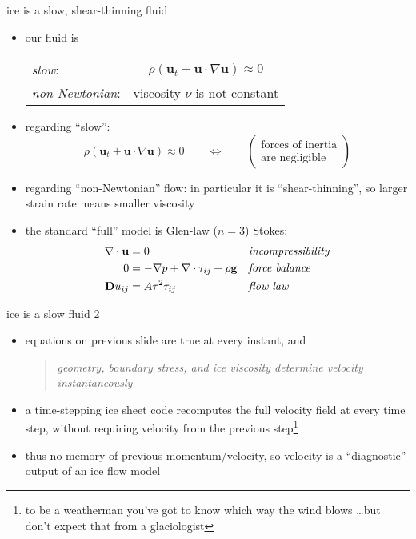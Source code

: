 \begin{frame}{ice is a slow, shear-thinning fluid}

\begin{itemize}
\item our fluid is

  \begin{tabular}{lc}
  \emph{slow}: & $\rho \left(\mathbf{u}_t + \mathbf{u}\cdot\nabla \mathbf{u}\right) \approx 0$ \\
  \emph{non-Newtonian}: & viscosity $\nu$ is not constant
  \end{tabular}
\item regarding ``slow'':
  $$\rho \left(\mathbf{u}_t + \mathbf{u}\cdot\nabla \mathbf{u}\right) \approx 0 \qquad \iff \qquad \begin{pmatrix} \text{forces of inertia} \\ \text{are negligible} \end{pmatrix}$$
\item regarding ``non-Newtonian'' flow:  in particular it is ``shear-thinning'', so larger strain rate means smaller viscosity
\item the standard ``full'' model is Glen-law ($n=3$) Stokes:
\begin{align*}
\nabla \cdot \mathbf{u} &= 0 &&\text{\emph{incompressibility}} \\
0 &= - \nabla p + \nabla \cdot \tau_{ij} + \rho \mathbf{g} &&\text{\emph{force balance}} \\
\mathbf{D}u_{ij} &= A \tau^2 \tau_{ij} &&\text{\emph{flow law}}
\end{align*}
\end{itemize}
\end{frame}


\begin{frame}{ice is a slow fluid 2}

\begin{itemize}
\item equations on previous slide are true at every instant, and
  \begin{quote}
  \emph{geometry, boundary stress, and ice viscosity determine velocity instantaneously}
  \end{quote}\item a time-stepping ice sheet code recomputes the full velocity field at every time step, without requiring velocity from the previous step\footnote{to be a weatherman you've got to know which way the wind blows \dots but don't expect that from a glaciologist}
\item thus no memory of previous momentum/velocity, so velocity is a ``diagnostic'' output of an ice flow model
\end{itemize}
\end{frame}


